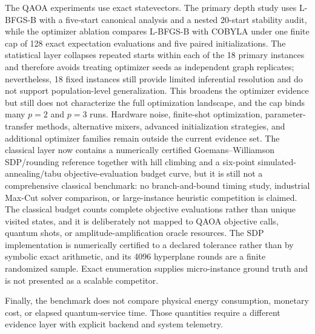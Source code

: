 \documentclass[5p,times]{elsarticle}
\begin{document}
The QAOA experiments use exact statevectors. The primary depth study uses L-BFGS-B with a five-start canonical analysis and a nested 20-start stability audit, while the optimizer ablation compares L-BFGS-B with COBYLA under one finite cap of 128 exact expectation evaluations and five paired initializations. The statistical layer collapses repeated starts within each of the 18 primary instances and therefore avoids treating optimizer seeds as independent graph replicates; nevertheless, 18 fixed instances still provide limited inferential resolution and do not support population-level generalization. This broadens the optimizer evidence but still does not characterize the full optimization landscape, and the cap binds many $p=2$ and $p=3$ runs. Hardware noise, finite-shot optimization, parameter-transfer methods, alternative mixers, advanced initialization strategies, and additional optimizer families remain outside the current evidence set. The classical layer now contains a numerically certified Goemans--Williamson SDP/rounding reference together with hill climbing and a six-point simulated-annealing/tabu objective-evaluation budget curve, but it is still not a comprehensive classical benchmark: no branch-and-bound timing study, industrial Max-Cut solver comparison, or large-instance heuristic competition is claimed. The classical budget counts complete objective evaluations rather than unique visited states, and it is deliberately not mapped to QAOA objective calls, quantum shots, or amplitude-amplification oracle resources. The SDP implementation is numerically certified to a declared tolerance rather than by symbolic exact arithmetic, and its 4096 hyperplane rounds are a finite randomized sample. Exact enumeration supplies micro-instance ground truth and is not presented as a scalable competitor.

Finally, the benchmark does not compare physical energy consumption, monetary cost, or elapsed quantum-service time. Those quantities require a different evidence layer with explicit backend and system telemetry.
\end{document}
